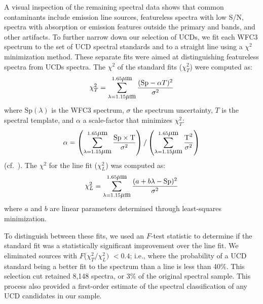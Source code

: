 \documentclass[manuscript]{aastex63}
\begin{document}
A visual inspection of the remaining spectral data shows that common contaminants include emission line sources, featureless spectra with low S/N, spectra with absorption or emission features outside the primary \wat and \meth bands, and other artifacts. To further narrow down our selection of UCDs, we fit each WFC3 spectrum to the set of UCD spectral standards and to a straight line using a $\chi^2$ minimization method.
These separate fits were aimed at distinguishing featureless spectra from UCDs spectra. 
The $\chi^2$ of the standard fits ($\chi^2 _T $) were computed as:
\begin{equation}
\chi^2_T= \sum _{\lambda = 1.15 \micron} ^{ 1.65 \micron} \frac{(\text{Sp}  - \alpha T)^2}{ \sigma ^2 }
\end{equation} 
where $\text{Sp}(\lambda)$ is the WFC3 spectrum, $\sigma$ the spectrum uncertainty, $T$ is the spectral template, and 
$\alpha$ a scale-factor that minimizes $\chi^2_T$: 
\begin{equation}
\alpha= \left(\sum_{\lambda = 1.15 \micron}^{ 1.65 \micron} \frac{\text{Sp}\times\text{T}}{\sigma^2}\right) / \left(\sum_{\lambda = 1.15 \micron}^{ 1.65 \micron} \frac{\text{T}^2}{\sigma^2}\right)
\end{equation} 
(cf.\ \citealt{2005ApJ...623.1115C}). The $\chi^2$ for the line fit ($\chi^2 _L$) was computed as:
\begin{equation}
\chi^2 _L  = \sum _{\lambda = 1.15 \micron} ^{ 1.65 \micron} \frac{(a + b \lambda-\text{Sp} )^2}{ \sigma ^2 }
\end{equation} 
where $a$ and $b$ are linear parameters determined through least-squares minimization. 

To distinguish between these fits, we used an $F$-test statistic to determine if the standard fit was a statistically significant improvement over the line fit. We  eliminated sources with $F$($\chi^2_T/\chi^2_L)$ $< 0.4$; i.e., where the probability of a UCD standard being a better fit to the spectrum than a line is less than 40\%. This selection cut retained 8,148 spectra, or 
3\% of the original spectral sample. This process also provided a first-order estimate of the spectral classification of any UCD candidates in our sample.
\end{document}
